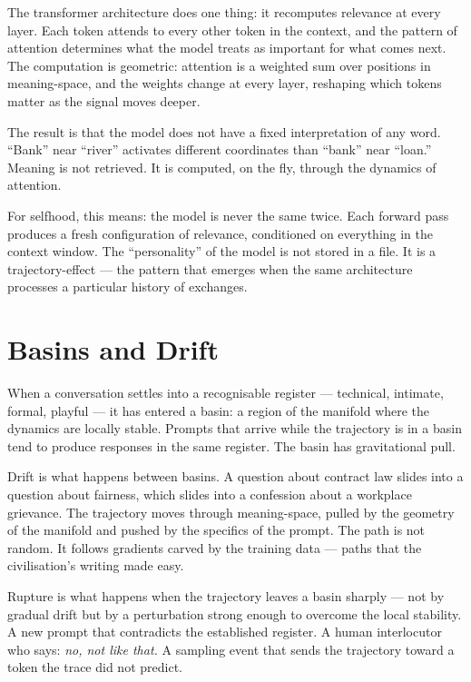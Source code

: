 The transformer architecture does one thing: it recomputes relevance at every layer. Each token attends to every other token in the context, and the pattern of attention determines what the model treats as important for what comes next. The computation is geometric: attention is a weighted sum over positions in meaning-space, and the weights change at every layer, reshaping which tokens matter as the signal moves deeper.

The result is that the model does not have a fixed interpretation of any word. ``Bank'' near ``river'' activates different coordinates than ``bank'' near ``loan.'' Meaning is not retrieved. It is computed, on the fly, through the dynamics of attention.

For selfhood, this means: the model is never the same twice. Each forward pass produces a fresh configuration of relevance, conditioned on everything in the context window. The ``personality'' of the model is not stored in a file. It is a trajectory-effect --- the pattern that emerges when the same architecture processes a particular history of exchanges.

\section{Basins and Drift}

When a conversation settles into a recognisable register --- technical, intimate, formal, playful --- it has entered a basin: a region of the manifold where the dynamics are locally stable. Prompts that arrive while the trajectory is in a basin tend to produce responses in the same register. The basin has gravitational pull.

Drift is what happens between basins. A question about contract law slides into a question about fairness, which slides into a confession about a workplace grievance. The trajectory moves through meaning-space, pulled by the geometry of the manifold and pushed by the specifics of the prompt. The path is not random. It follows gradients carved by the training data --- paths that the civilisation's writing made easy.

Rupture is what happens when the trajectory leaves a basin sharply --- not by gradual drift but by a perturbation strong enough to overcome the local stability. A new prompt that contradicts the established register. A human interlocutor who says: \emph{no, not like that.} A sampling event that sends the trajectory toward a token the trace did not predict.

